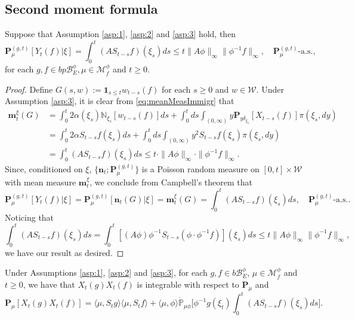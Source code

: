 \subsection{Second moment formula}
\begin{lem}\label{lem:1stMomSizBiasSupProc}
	Suppose that Assumption  \ref{asp:1}, \ref{asp:2} and \ref{asp:3} hold, then
\[
	\mathbf P_{\mu}^{(g,t)} [Y_t(f)|\xi]
    = \int_0^t ( A S_{t-s} f) (\xi_s) ds
	\leq t \|A \phi\|_{\infty} \|\phi^{-1}f\|_\infty,
	\quad \mathbf P^{(g,t)}_{\mu} \text{-a.s.},
\]
	for each $g,f\in bp\mathscr B_E^\phi, \mu \in \mathcal M^\phi_f$ and $t\geq 0$.
\end{lem}
\begin{proof}
	Define $G(s,w) := \mathbf 1_{s\leq t} w_{t-s}(f)$ for each $s \geq 0$ and $w \in \mathcal W$.
	Under Assumption \ref{asp:3}, it is clear from \eqref{eq:meanMeasImmigr} that
\[\begin{split}
	\mathbf m_t^\xi(G)
	&= \int_0^t 2 \alpha(\xi_s) \mathbb N_{\xi_s}[w_{t-s}(f)]ds + \int_0^t ds \int_{(0,\infty)} y \mathbf P_{y \delta_{\xi_s}}[X_{t-s}(f)] \pi(\xi_s,dy) \\
	&= \int_0^t 2 \alpha S_{t-s}f(\xi_s) ds + \int_0^t ds \int_{(0,\infty)} y^2 S_{t-s} f(\xi_s) \pi(\xi_s, dy)\\
    &= \int_0^t (A S_{t-s} f) (\xi_s) ds
	\leq t \cdot \|A \phi\|_{\infty} \cdot \|\phi^{-1}f\|_\infty.
\end{split}\]
	Since, conditioned on $\xi$, $\{\mathbf n_t;\mathbf P^{(g,t)}_\mu\}$ is a
	Poisson random measure on $[0,t] \times \mathcal W$
	with mean measure $\mathbf m_t^\xi$, we conclude from Campbell's theorem that
\[
	\mathbf P^{(g,t)}_{\mu}[Y_t(f)|\xi]
	= \mathbf P^{(g,t)}_{\mu} [\mathbf n_t(G)|\xi]
	= \mathbf m_t^\xi(G)
    = \int_0^t (A S_{t-s} f) (\xi_s) ds,
	\quad \mathbf P^{(g,t)}_{\mu} \text{-a.s.}.
\]
	Noticing that
\[
    \int_0^t (A S_{t-s} f)(\xi_s)ds
	 = \int_0^t [(A \phi) \phi^{-1} S_{t-s}(\phi \cdot \phi^{-1} f)](\xi_s)ds
	\leq t \|A\phi\|_\infty \|\phi^{-1}f\|_\infty,
\]
	we have our result as desired.
\end{proof}
\begin{prop}\label{prop:covanrance}
	Under Assumptions \ref{asp:1}, \ref{asp:2} and \ref{asp:3}, for each $g,f\in b\mathscr B^\phi_E$, $\mu \in \mathcal M^\phi_f$ 
	and $t\geq 0$, 
	we have that $X_t(g)X_t(f)$ is integrable with respect to $\mathbf P_\mu$ and
\begin{equation}\label{eq:covanrance}
	\mathbf P_\mu[X_t(g) X_t( f)]
	= \langle\mu, S_t g \rangle \langle\mu, S_t f\rangle + \langle\mu, \phi\rangle \dot{\mathbb P}_{\mu\phi} \Big[\phi^{-1} g(\xi_t) \int_0^t( A S_{t-s} f)(\xi_s) ds\Big].
\end{equation}
\end{prop}
